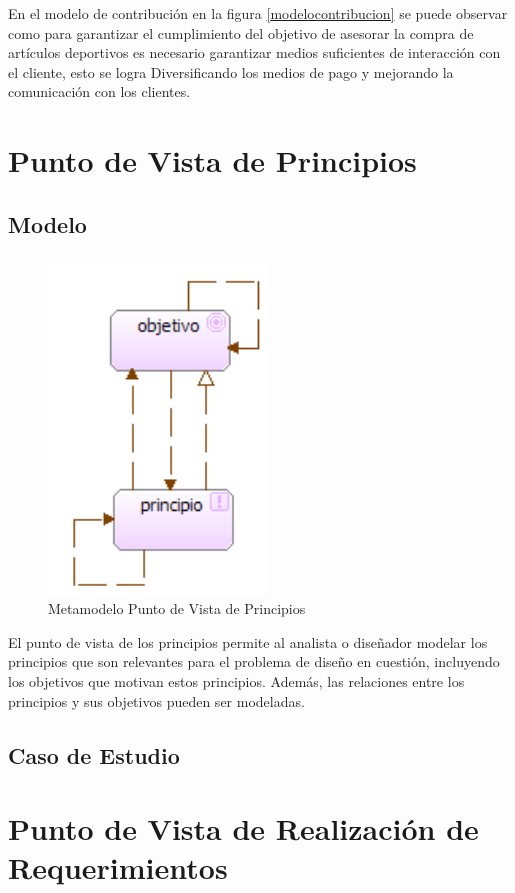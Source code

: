 En el modelo de contribución en la figura \ref{modelocontribucion} se puede observar como para garantizar el cumplimiento del objetivo de asesorar la compra de artículos deportivos es necesario garantizar medios suficientes de interacción con el cliente, esto se logra Diversificando los medios de pago y mejorando la comunicación con los clientes.

\newpage

\section{Punto de Vista de Principios}

\subsection{Modelo}

\begin{figure}[th!]
	\centering
	\includegraphics[width=0.3\linewidth]{arquitectura/imagenes/modeloPrincipios}
	\caption{Metamodelo Punto de Vista de Principios}
	\label{metamodelo principios}
\end{figure}
El punto de vista de los principios permite al analista o diseñador modelar los principios que son relevantes para el problema de diseño en cuestión, incluyendo los objetivos que motivan estos principios. Además, las relaciones entre los principios y sus objetivos pueden ser modeladas. 

\subsection{Caso de Estudio}

\newpage

\section{Punto de Vista de Realización de Requerimientos}

